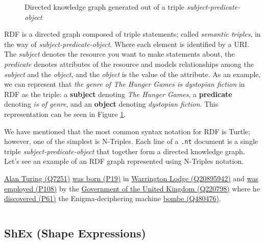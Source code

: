 \begin{figure}[ht]
    \centering
    
    \caption{Directed knowledge graph generated out of a triple \textit{subject-predicate-object}}
    \label{fig:RDF}
\end{figure}

RDF is a directed graph composed of triple statements; called \textit{semantic triples}, in the way of \textit{subject-predicate-object}. Where each element is identified by a URI. The \textit{subject} denotes the resource you want to make statements about, the \textit{predicate} denotes attributes of the resource and models relationships among the \textit{subject} and the \textit{object}, and the \textit{object} is the value of the attribute. As an example, we can represent that \textit{the genre of The Hunger Games is dystopian fiction} in RDF as the triple: a \textbf{subject} denoting \textit{The Hunger Games}, a \textbf{predicate} denoting \textit{is of genre}, and an \textbf{object} denoting \textit{dystopian fiction}. This representation can be seen in Figure \ref{fig:RDF}.

We have mentioned that the most common syntax notation for RDF is Turtle; however, one of the simplest is N-Triples. Each line of a \texttt{.nt} document is a single triple \textit{subject-predicate-object} that together form a directed knowledge graph. Let's see an example of an RDF graph represented using N-Triples notation.

\begin{example}
    \href{https://www.wikidata.org/entity/Q7251}{Alan Turing (Q7251)} \href{https://www.wikidata.org/entity/P19}{was born (P19)} in \href{https://www.wikidata.org/entity/Q20895942}{Warrington Lodge (Q20895942)} and \href{https://www.wikidataWShEx.org/entity/P108}{was employed (P108)} by the \href{https://www.wikidata.org/entity/Q220798}{Government of the United Kingdom (Q220798)} where he \href{https://www.wikidata.org/entity/P61}{discovered (P61)} the Enigma-deciphering machine \href{https://www.wikidata.org/entity/Q480476}{bombe (Q480476)}.
\end{example}

\begin{dumps}
    \inputminted{turtle}{code/listings/6-3_serialization.nt}
\end{dumps}

\subsection{ShEx (Shape Expressions)}

